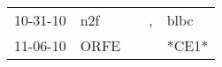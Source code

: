 \begin{supertabular}{p{0.07\textwidth}p{0.06\textwidth}p{0.02\textwidth}p{0.02\textwidth}p{0.06\textwidth}}
 10-31-10\textsuperscript{} &   n2f\textsuperscript{} &   &  , &  blbc\textsuperscript{} \\
 11-06-10\textsuperscript{} &  ORFE\textsuperscript{} &   &    &                   *CE1* \\
\end{supertabular}
